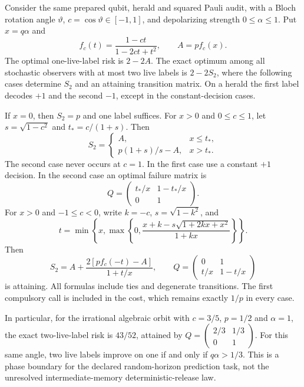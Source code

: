 \begin{theorem}\label{thm:two-label-quantum}
Consider the same prepared qubit, herald and squared Pauli audit, with a Bloch rotation angle $\vartheta$, $c=\cos\vartheta\in[-1,1]$, and depolarizing strength $0\le\alpha\le1$. Put $x=q\alpha$ and
\[
 f_c(t)=\frac{1-ct}{1-2ct+t^2},\qquad A=p f_c(x).
\]
The optimal one-live-label risk is $2-2A$. The exact optimum among all stochastic observers with at most two live labels is $2-2S_2$, where the following cases determine $S_2$ and an attaining transition matrix. On a herald the first label decodes $+1$ and the second $-1$, except in the constant-decision cases.

If $x=0$, then $S_2=p$ and one label suffices. For $x>0$ and $0\le c\le1$, let $s=\sqrt{1-c^2}$ and $t_*=c/(1+s)$. Then
\[
 S_2=\begin{cases}
 A,&x\le t_*,\\
 p(1+s)/s-A,&x>t_*.
 \end{cases}
\]
The second case never occurs at $c=1$. In the first case use a constant $+1$ decision. In the second case an optimal failure matrix is
\[
 Q=\begin{pmatrix}t_*/x&1-t_*/x\\0&1\end{pmatrix}.
\]
For $x>0$ and $-1\le c<0$, write $k=-c$, $s=\sqrt{1-k^2}$, and
\[
 t=\min\left\{x,\max\left\{0,
       \frac{x+k-s\sqrt{1+2kx+x^2}}{1+kx}\right\}\right\}.
\]
Then
\[
 S_2=A+\frac{2[p f_c(-t)-A]}{1+t/x},\qquad
 Q=\begin{pmatrix}0&1\\t/x&1-t/x\end{pmatrix}
\]
is attaining. All formulas include ties and degenerate transitions. The first compulsory call is included in the cost, which remains exactly $1/p$ in every case.

In particular, for the irrational algebraic orbit with $c=3/5$, $p=1/2$ and $\alpha=1$, the exact two-live-label risk is $43/52$, attained by
$Q=\left(\begin{smallmatrix}2/3&1/3\\0&1\end{smallmatrix}\right)$.
For this same angle, two live labels improve on one if and only if $q\alpha>1/3$. This is a phase boundary for the declared random-horizon prediction task, not the unresolved intermediate-memory deterministic-release law.
\end{theorem}
